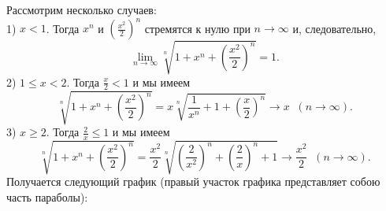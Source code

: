 \documentclass{article}
\begin{document}
Рассмотрим несколько случаев:\\
1) $x<1$. Тогда $x^n$ и $( \frac{x^2}{2} )^n$ стремятся к нулю при $n \to \infty$ и, следовательно,
$$\lim\limits_{n\to \infty} \sqrt[n]{1 + x^n + \left( \frac{x^2}{2} \right)^n} = 1.$$
2) $1 \leqslant x < 2$. Тогда $\frac{x}{2} < 1$ и мы имеем
$$\sqrt[n]{1 + x^n + \left( \frac{x^2}{2} \right)^n} = x \sqrt[n]{\frac{1}{x^n} + 1 + \left( \frac{x}{2} \right)^n} \to x\;\;(n \to \infty).$$
3) $x \geqslant 2$. Тогда $\frac{2}{x} \leqslant 1$ и мы имеем
$$\sqrt[n]{1 + x^n + \left( \frac{x^2}{2} \right)^n} = \frac{x^2}{2} \sqrt[n]{\left( \frac{2}{x^2} \right)^n + \left( \frac{2}{x} \right)^n + 1} \to \frac{x^2}{2}\;\;(n \to \infty).$$
Получается следующий график (правый участок графика представляет собою часть параболы):
\begin{figure}[h]
\end{figure}
\end{document}
